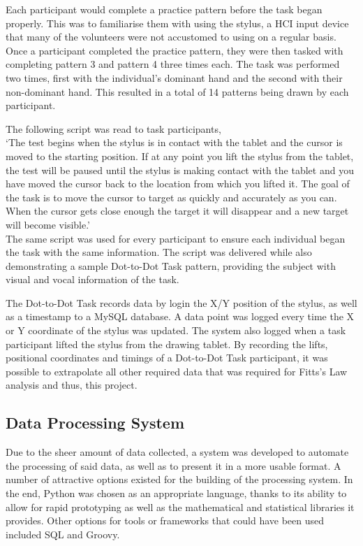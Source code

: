 		Each participant would complete a practice pattern before the task began properly. This was to familiarise them with using the stylus, a HCI input device that many of the volunteers were not accustomed to using on a regular basis. Once a participant completed the practice pattern, they were then tasked with completing pattern 3 and pattern 4 three times each. The task was performed two times, first with the individual's dominant hand and the second with their non-dominant hand. This resulted in a total of 14 patterns being drawn by each participant.
	
		The following script was read to task participants,\\
	
		‘The test begins when the stylus is in contact with the tablet and the cursor is moved to the starting position. If at any point you lift the stylus from the tablet, the test will be paused until the stylus is making contact with the tablet and you have moved the cursor back to the location from which you lifted it. The goal of the task is to move the cursor to target as quickly and accurately as you can. When the cursor gets close enough the target it will disappear and a new target will become visible.’\\
	
		The same script was used for every participant to ensure each individual began the task with the same information. The script was delivered while also demonstrating a sample Dot-to-Dot Task pattern, providing the subject with visual and vocal information of the task. 
	
		The Dot-to-Dot Task records data by login the X/Y position of the stylus, as well as a timestamp to a MySQL database. A data point was logged every time the X or Y coordinate of the stylus was updated. The system also logged when a task participant lifted the stylus from the drawing tablet. By recording the lifts, positional coordinates and timings of a Dot-to-Dot Task participant, it was possible to extrapolate all other required data that was required for Fitts’s Law analysis and thus, this project.
	
	\subsection{Data Processing System}
		Due to the sheer amount of data collected, a system was developed to automate the processing of said data, as well as to present it in a more usable format. A number of attractive options existed for the building of the processing system. In the end, Python was chosen as an appropriate language, thanks to its ability to allow for rapid prototyping as well as the mathematical and statistical libraries it provides.  Other options for tools or frameworks that could have been used included SQL and Groovy. 
		
